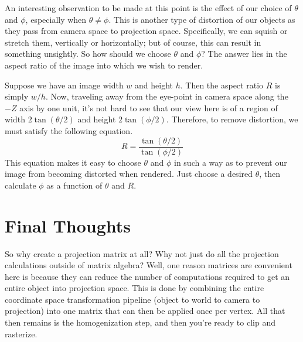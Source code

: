 \documentclass[12pt]{article}
\begin{document}
An interesting observation to be made at this point is the effect of our choice of $\theta$ and $\phi$, especially when
$\theta\neq\phi$.  This is another type of distortion of our objects as they pass from camera space to projection space.
Specifically, we can squish or stretch them, vertically or horizontally; but of course, this can result in something
unsightly.  So how should we choose $\theta$ and $\phi$?  The answer lies in the aspect ratio of the image into which we wish to render.

Suppose we have an image width $w$ and height $h$.  Then the aspect ratio $R$ is simply $w/h$.  Now, traveling away from the eye-point in camera space along the $-Z$ axis by one unit, it's not hard to see that our view here is of a region of width $2\tan(\theta/2)$ and height $2\tan(\phi/2)$.  Therefore, to remove distortion, we must satisfy the following equation.
\begin{equation*}
R = \frac{\tan(\theta/2)}{\tan(\phi/2)}
\end{equation*}
This equation makes it easy to choose $\theta$ and $\phi$ in such a way as to prevent our image from becoming distorted when rendered.  Just choose a desired $\theta$, then calculate $\phi$ as a function of $\theta$ and $R$.

\section*{Final Thoughts}

So why create a projection matrix at all?  Why not just do all the projection calculations outside of matrix algebra?  Well, one reason matrices are convenient here is because they can reduce the number of computations required to get an entire object into projection space.  This is done by combining the entire coordinate space transformation pipeline (object to world to camera to projection) into one matrix that can then be applied once per vertex.  All that then remains is the homogenization step, and then you're ready to clip and rasterize.
\end{document}

